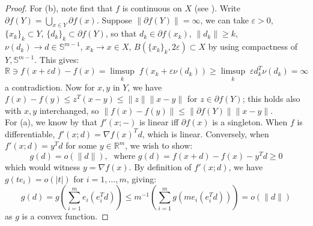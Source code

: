 \begin{proof}
	For (b), note first that $f$ is continuous on $X$ (see ). Write $\partial f(Y)=\bigcup_{x\in Y}\partial f(x)$. Suppose $\|\partial f(Y)\|=\infty$, we can take $\varepsilon >0$, $\{x_k\}_{k}\subset Y$, $\{d_k\}_{k}\subset \partial f(Y)$, so that $d_k\in \partial f(x_k)$, $\|d_k\|\geq k$, $\nu(d_k)\to d\in \mathbb{S}^{m-1}$, $x_k\to x\in X$, $B(\{x_k\}_{k},2 \varepsilon )\subset X$ by using compactness of $Y, \mathbb{S}^{m-1}$. This gives:
	\[
		\mathbb{R}\ni f(x+\varepsilon d) - f(x) = \underset{k}{\operatorname{limsup}}\;f(x_k + \varepsilon \nu(d_k)) \geq \underset{k}{\operatorname{limsup}}\;\varepsilon d_k^T \nu(d_k) = \infty
	\]
	a contradiction. Now for $x,y$ in $Y$, we have $f(x)-f(y)\leq z^T(x-y)\leq \|z\|\|x-y\|$ for $z\in \partial f(Y)$; this holds also with $x,y$ interchanged, so $\|f(x)-f(y)\|\leq \|\partial f(Y)\|\|x-y\|$.\\
	For (a), we know by  that $f'(x;-)$ is linear iff $\partial f(x)$ is a singleton. When $f$ is differentiable, $f'(x;d)=\nabla f(x)^Td$, which is linear. Conversely, when $f'(x; d)=y^Td$ for some $y\in \mathbb{R}^m$, we wish to show:
	\[
		g(d)=o(\|d\|),\;\text{ where }g(d)=f(x+d)-f(x)-y^Td\geq 0
	\]
	which would witness $y=\nabla f(x)$. By definition of $f'(x;d)$, we have $g(te_i)=o(|t|)$ for $i=1,\dotsc,m$, giving:
	\[
		g(d)= g \left( \sum_{i=1}^m e_i\left(e_i^Td\right) \right) \leq m^{-1} \left( \sum_{i=1}^m g\left(me_i(e_i^Td)\right) \right) = o(\|d\|)
	\]
	as $g$ is a convex function.
\end{proof}
